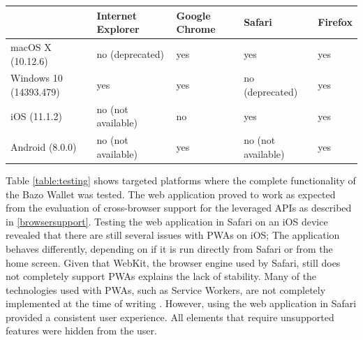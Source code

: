 \begin{center}
    \begin{tabular}{ | l | l | l | l | p{2cm} |}
    \hline
      & Internet Explorer & Google Chrome & Safari & Firefox \\ \hline
    macOS X (10.12.6)  & no (deprecated) & yes & yes & yes \\ \hline
    Windows 10 (14393.479)  & yes & yes & no (deprecated) & yes \\ \hline
    iOS (11.1.2)  & no (not available) & no & yes & yes \\ \hline
    Android (8.0.0)  & no (not available) & yes & no (not available) & yes \\ \hline
    \end{tabular}
    \label{table:testing}
    \end{center}
Table \ref{table:testing} shows targeted platforms where the complete functionality of the Bazo Wallet was tested. The web application proved to work as expected from the evaluation of cross-browser support for the leveraged APIs as described in \ref{browsersupport}. Testing the web application in Safari on an iOS device revealed that there are still several issues with PWAs on iOS; The application behaves differently, depending on if it is run directly from Safari or from the home screen. Given that WebKit, the browser engine used by Safari, still does not completely support PWAs explains the lack of stability. Many of the technologies used with PWAs, such as Service Workers, are not completely implemented at the time of writing \cite{webkitsw}. However, using the web application in Safari provided a consistent user experience. All elements that require unsupported features were hidden from the user.

